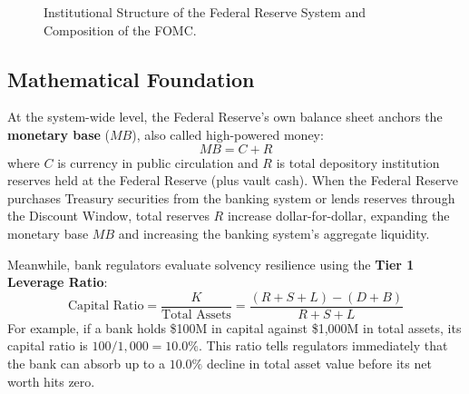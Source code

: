 \documentclass[11pt, oneside]{book}
\begin{document}
\begin{figure}[htbp]
\caption{Institutional Structure of the Federal Reserve System and Composition of the FOMC.}
\label{fig:fed_structure}
\end{figure}

\subsection*{Mathematical Foundation}

At the system-wide level, the Federal Reserve's own balance sheet anchors the \textbf{monetary base} ($MB$), also called high-powered money:
\begin{equation}
  MB = C + R
  \label{eq:monetary_base}
\end{equation}
where $C$ is currency in public circulation and $R$ is total depository institution reserves held at the Federal Reserve (plus vault cash). When the Federal Reserve purchases Treasury securities from the banking system or lends reserves through the Discount Window, total reserves $R$ increase dollar-for-dollar, expanding the monetary base $MB$ and increasing the banking system's aggregate liquidity.

Meanwhile, bank regulators evaluate solvency resilience using the \textbf{Tier 1 Leverage Ratio}:
\begin{equation}
  \text{Capital Ratio} = \frac{K}{\text{Total Assets}} = \frac{(R + S + L) - (D + B)}{R + S + L}
  \label{eq:capital_ratio}
\end{equation}
For example, if a bank holds \$100M in capital against \$1,000M in total assets, its capital ratio is $100 / 1{,}000 = 10.0\%$. This ratio tells regulators immediately that the bank can absorb up to a $10.0\%$ decline in total asset value before its net worth hits zero.
\end{document}
